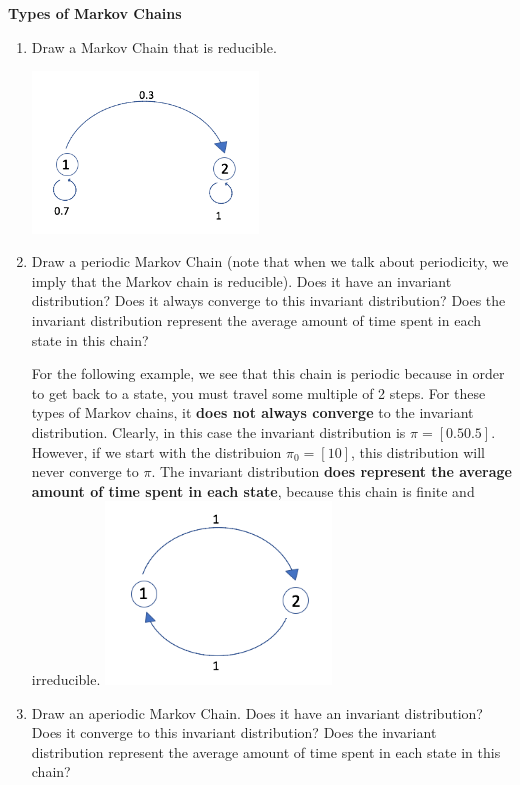\question \textbf{Types of Markov Chains} \newline
\begin{enumerate}[label=(\alph*)]
\item Draw a Markov Chain that is reducible.
\begin{solution}[2cm]
\includegraphics[width=6cm]{reducible.png}
\end{solution}
\item Draw a periodic Markov Chain (note that when we talk about periodicity, we imply that the Markov chain is reducible). Does it have an invariant distribution? Does it always converge to this invariant distribution? Does the invariant distribution represent the average amount of time spent in each state in this chain? 
\begin{solution}[2cm]
For the following example, we see that this chain is periodic because in order to get back to a state, you must travel some multiple of 2 steps. For these types of Markov chains, it \textbf{does not always converge} to the invariant distribution. Clearly, in this case the invariant distribution is $\pi = [0.5 0.5]$. However, if we start with the distribuion $\pi_0 = [1 0]$, this distribution will never converge to $\pi$. The invariant distribution \textbf{does represent the average amount of time spent in each state}, because this chain is finite and irreducible. 
\includegraphics[width=6cm]{periodic.png}
\end{solution}

\item Draw an aperiodic Markov Chain. Does it have an invariant distribution? Does it converge to this
invariant distribution? Does the invariant distribution represent the average amount of time spent in each state in this chain? 


\end{enumerate}
